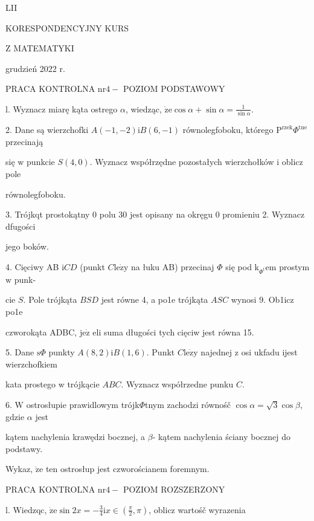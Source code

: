 \documentclass[a4paper,12pt]{article}
\begin{document}
LII

KORESPONDENCYJNY KURS

Z MATEMATYKI

grudzień 2022 r.

PRACA KONTROLNA $\mathrm{n}\mathrm{r} 4-$ POZIOM PODSTAWOWY

l. Wyznacz miarę kąta ostrego $\alpha$, wiedząc, $\dot{\mathrm{z}}\mathrm{e} \displaystyle \cos\alpha+\sin\alpha=\frac{1}{\sin\alpha}.$

2. Dane są wierzchofki $A(-1,-2)\mathrm{i}B(6,-1)$ równolegfoboku, którego $\mathrm{P}^{\mathrm{r}\mathrm{z}\mathrm{e}\mathrm{k}}\Phi^{\mathrm{t}\mathrm{n}\mathrm{e}}$ przecinają

się $\mathrm{w}$ punkcie $S(4,0)$. Wyznacz współrzędne pozostałych wierzchołków $\mathrm{i}$ oblicz pole

równolegfoboku.

3. Trójkqt prostokątny $0$ polu 30 jest opisany na okręgu $0$ promieniu 2. Wyznacz dfugości

jego boków.

4. Cięciwy AB $\mathrm{i}CD$ (punkt $C\mathrm{l}\mathrm{e}\dot{\mathrm{z}}\mathrm{y}$ na łuku AB) przecinaj $\Phi$ się pod $\mathrm{k}_{\Phi^{\mathrm{t}}}\mathrm{e}\mathrm{m}$ prostym $\mathrm{w}$ punk-

cie $S$. Pole trójkąta $BSD$ jest równe 4, a po1e trójkąta $ASC$ wynosi 9. Ob1icz po1e

czworokąta ADBC, $\mathrm{j}\mathrm{e}\dot{\mathrm{z}}$ eli suma długości tych cięciw jest równa 15.

5. Dane $\mathrm{s}\Phi$ punkty $A(8,2)\mathrm{i}B(1,6)$. Punkt $C\mathrm{l}\mathrm{e}\dot{\mathrm{z}}\mathrm{y}$ najednej $\mathrm{z}$ osi ukfadu ijest wierzchofkiem

kata prostego $\mathrm{w}$ trójkącie $ABC$. Wyznacz współrzedne punku $C.$

6. $\mathrm{W}$ ostrosłupie prawidlowym trójk$\Phi$tnym zachodzi równośč $\cos\alpha=\sqrt{3}\cos\beta$, gdzie $\alpha$ jest

kątem nachylenia krawędzi bocznej, a $\beta$- kątem nachylenia ściany bocznej do podstawy.

Wykaz, $\dot{\mathrm{z}}\mathrm{e}$ ten ostrosłup jest czworościanem foremnym.




PRACA KONTROLNA $\mathrm{n}\mathrm{r} 4-$ POZIOM ROZSZERZONY

l. Wiedzqc, $\displaystyle \dot{\mathrm{z}}\mathrm{e}\sin 2x=-\frac{3}{4} \mathrm{i}  x\in (\displaystyle \frac{\pi}{2},\pi)$, oblicz wartośč wyrazenia
\end{document}
